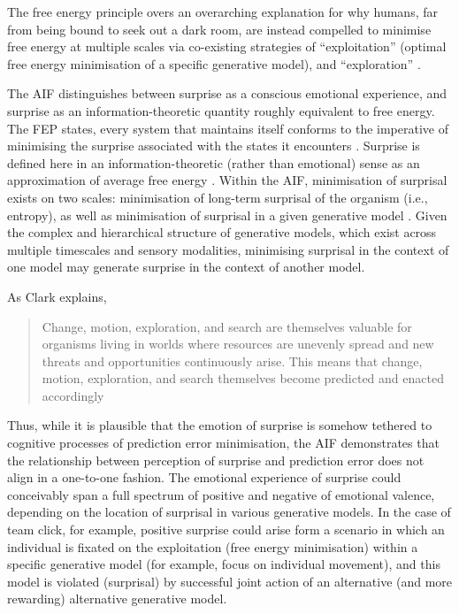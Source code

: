 \begin{CJK}{UTF8}{gbsn}
The free energy principle overs an overarching explanation for why humans, far from being bound to seek out a dark room, are instead compelled to minimise free energy at multiple scales via co-existing strategies of ``exploitation'' (optimal free energy minimisation of a specific generative model), and ``exploration'' \citep[optimal free energy reduction of surprisal on broader scales, i.e., in the context of other generative models or the life of the organism more generally; see][]{Cohen2007}.

The AIF distinguishes between surprise as a conscious emotional experience, and surprise as an information-theoretic quantity roughly equivalent to free energy.  The FEP states, every system that maintains itself conforms to the imperative of minimising the surprise associated with the states it encounters \citep{Friston2012a}.  Surprise is defined here in an information-theoretic (rather than emotional) sense as an approximation of average free energy \citep[in fact, Tribus distinguished information-theoretic ``surprisal'' from surprise in an active attempt to separate the two concepts cf.][]{Tribus1961}.  Within the AIF, minimisation of surprisal exists on two scales: minimisation of long-term surprisal of the organism (i.e., entropy), as well as minimisation of surprisal in a given generative model \citep[i.e., free energy, see][2]{Schwartenbeck2013}. Given the complex and hierarchical structure of generative models, which exist across multiple timescales and sensory modalities,  minimising surprisal in the context of one model may generate surprise in the context of another model.

As Clark explains,

      \begin{quote}
        Change, motion, exploration, and search are themselves valuable for organisms living in worlds where resources are unevenly spread and new threats and opportunities continuously arise.  This means that change, motion, exploration, and search themselves become predicted and enacted accordingly \citep[193]{Clark2013}
      \end{quote}

Thus, while it is plausible that the emotion of surprise is somehow tethered to cognitive processes of prediction error minimisation, the AIF demonstrates that the relationship between perception of surprise and prediction error does not align in a one-to-one fashion. The emotional experience of surprise could conceivably span a full spectrum of positive and negative of emotional valence, depending on the location of surprisal in various generative models. In the case of team click, for example, positive surprise could arise form a scenario in which an individual is fixated on the exploitation (free energy minimisation) within a specific generative model (for example, focus on individual movement), and this model is violated (surprisal) by successful joint action of an alternative (and more rewarding) alternative generative model.


\end{CJK}
